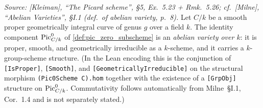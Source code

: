 \begin{theorem}\leanok
  \label{thm:pic_zero_is_abelian_variety}

  \textit{Source: [Kleiman], ``The Picard scheme'', \S 5,
  Ex.~5.23 + Rmk.~5.26; cf.\ [Milne], ``Abelian Varieties'',
  \S I.1 (def.\ of abelian variety, p.~8).}
  Let \(C/k\) be a smooth proper geometrically integral curve of genus
  \(g\) over a field \(k\). The identity component \(\operatorname{Pic}^0_{C/k}\) of
  \cref{def:pic_zero_subscheme} is an \emph{abelian variety over
  \(k\)}: it is proper, smooth, and geometrically irreducible as a
  \(k\)-scheme, and it carries a \(k\)-group-scheme structure. (In the
  Lean encoding this is the conjunction of
  \texttt{[IsProper]}, \texttt{[Smooth]}, and
  \texttt{[GeometricallyIrreducible]} on the structural morphism
  \texttt{(Pic0Scheme C).hom} together with the existence of a
  \texttt{[GrpObj]} structure on \(\operatorname{Pic}^0_{C/k}\). Commutativity
  follows automatically from Milne~\S I.1, Cor.~1.4 and is not
  separately stated.)
\end{theorem}

